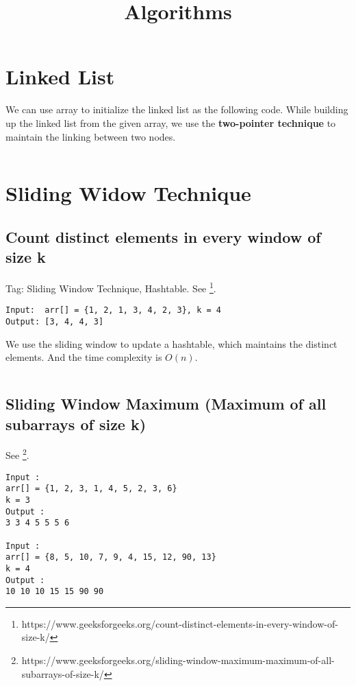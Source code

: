 \documentclass[11pt]{article}
\title{Algorithms}
\begin{document}
\maketitle

\tableofcontents

\section{Linked List}
We can use array to initialize the linked list as the following code.
While building up the linked list from the given array, we use the \textbf{two-pointer technique} to maintain the linking between two nodes.
\inputminted[breaklines=true,frame=leftline, linenos=true]{python}{src/linkedlist.py}

\section{Sliding Widow Technique}
\subsection{Count distinct elements in every window of size k}
Tag: Sliding Window Technique, Hashtable. 
See \footnote{https://www.geeksforgeeks.org/count-distinct-elements-in-every-window-of-size-k/}.

\begin{verbatim}
Input:  arr[] = {1, 2, 1, 3, 4, 2, 3}, k = 4
Output: [3, 4, 4, 3]
\end{verbatim}

We use the sliding window to update a hashtable, which maintains the distinct elements. And the time complexity is $O(n)$.

\inputminted{python}{src/distinct.py}

\subsection{Sliding Window Maximum (Maximum of all subarrays of size k)}

See \footnote{https://www.geeksforgeeks.org/sliding-window-maximum-maximum-of-all-subarrays-of-size-k/}.
\begin{verbatim}
Input :
arr[] = {1, 2, 3, 1, 4, 5, 2, 3, 6}
k = 3
Output :
3 3 4 5 5 5 6

Input :
arr[] = {8, 5, 10, 7, 9, 4, 15, 12, 90, 13}
k = 4
Output :
10 10 10 15 15 90 90
\end{verbatim}
\end{document}
